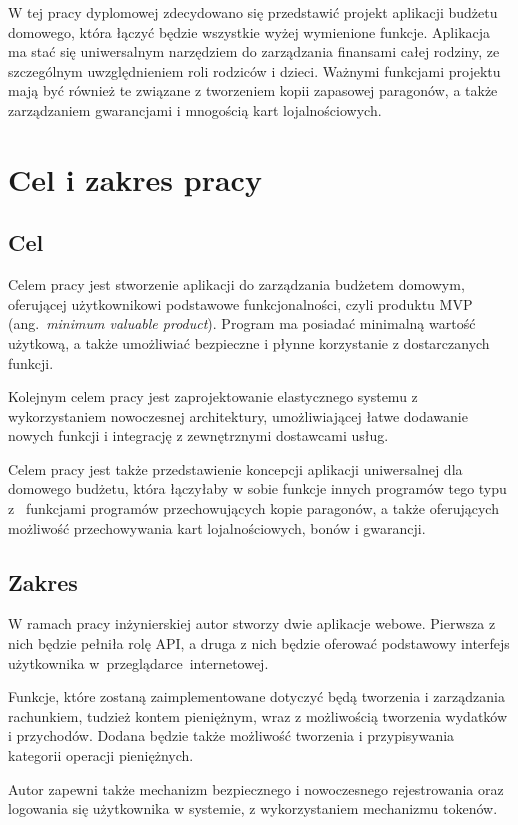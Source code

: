 W tej pracy dyplomowej zdecydowano się przedstawić projekt aplikacji budżetu domowego, która łączyć będzie wszystkie wyżej wymienione funkcje. Aplikacja ma stać się uniwersalnym narzędziem do zarządzania finansami całej rodziny, ze szczególnym uwzględnieniem roli rodziców i dzieci. Ważnymi funkcjami projektu mają być również te związane z tworzeniem kopii zapasowej paragonów, a także zarządzaniem gwarancjami i mnogością kart lojalnościowych.

\section{Cel i zakres pracy}
\label{sec:cel-zakres}
\subsection{Cel}
\label{subsec:cel}
Celem pracy jest stworzenie aplikacji do zarządzania budżetem domowym, oferującej użytkownikowi podstawowe funkcjonalności, czyli produktu MVP (ang.~\emph{minimum valuable product}). Program ma posiadać minimalną wartość użytkową, a także umożliwiać bezpieczne i płynne korzystanie z dostarczanych funkcji.  

Kolejnym celem pracy jest zaprojektowanie elastycznego systemu z wykorzystaniem nowoczesnej architektury, umożliwiającej łatwe dodawanie nowych funkcji i integrację z zewnętrznymi dostawcami usług.

Celem pracy jest także przedstawienie koncepcji aplikacji uniwersalnej dla domowego budżetu, która łączyłaby w sobie funkcje innych programów tego typu z~ funkcjami programów przechowujących kopie paragonów, a także oferujących możliwość przechowywania kart lojalnościowych, bonów i gwarancji.

\subsection{Zakres}
\label{subsec:zakres}
W ramach pracy inżynierskiej autor stworzy dwie aplikacje webowe. Pierwsza z nich będzie pełniła rolę API, a druga z nich będzie oferować podstawowy interfejs użytkownika w~przeglądarce~internetowej.

Funkcje, które zostaną zaimplementowane dotyczyć będą tworzenia i zarządzania  rachunkiem, tudzież kontem pieniężnym, wraz z możliwością tworzenia wydatków i przychodów. Dodana będzie także możliwość tworzenia i przypisywania kategorii operacji pieniężnych.

Autor zapewni także mechanizm bezpiecznego i nowoczesnego rejestrowania oraz logowania się użytkownika w systemie, z wykorzystaniem mechanizmu tokenów.

